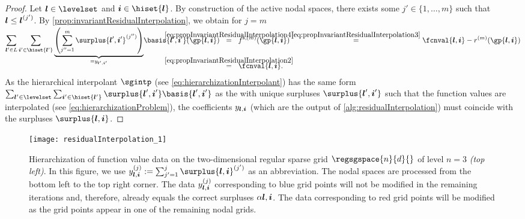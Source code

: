 \begin{proof}
  Let $\*l \in \levelset$ and $\*i \in \hiset{\*l}$.
  By construction of the active nodal spaces,
  there exists some $j' \in \{1, \dotsc, m\}$ such that ${\boldsymbol{l}} \le {\boldsymbol{l}}^{(j')}$.
  By \cref{prop:invariantResidualInterpolation}, we obtain
  for $j = m$
  \begin{subequations}
    \begin{align}
      \sum_{\*l' \in L} \sum_{\*i' \in \hiset{\*l'}}
      \smash{
        \underbrace{
          \left(\sum_{j''=1}^{m} \surplus{\*l',\*i'}^{(j'')}\right)
        }_{= \linout{\*l',\*i'}}
      }
      \basis{\*l',\*i'}(\gp{\*l,\*i})
      &\quad\;
      \mathclap{\overset{\eqref{eq:propInvariantResidualInterpolation4}}{=}}
      \quad\;
      f^{\sparse,(m)}(\gp{\*l,\*i})
      \overset{\eqref{eq:propInvariantResidualInterpolation3}}{=}
      \fcnval{\*l,\*i} - r^{(m)}(\gp{\*l,\*i})\\
      &\quad\;
      \mathclap{\overset{\eqref{eq:propInvariantResidualInterpolation2}}{=}}
      \quad\;
      \fcnval{\*l,\*i}.
    \end{align}
  \end{subequations}
  As the hierarchical interpolant $\sgintp$
  (see \eqref{eq:hierarchizationInterpolant})
  has the same form
  $\sum_{\*l' \in \levelset} \sum_{\*i' \in \hiset{\*l'}}
  \surplus{\*l',\*i'} \basis{\*l',\*i'}$ as the \lhs
  with unique surpluses $\surplus{\*l',\*i'}$ such that the function values
  are interpolated (see \eqref{eq:hierarchizationProblem}),
  the coefficients $y_{{\boldsymbol{l}},{\boldsymbol{i}}}$
  (which are the output of \cref{alg:residualInterpolation})
  must coincide with the surpluses $\surplus{\*l,\*i}$.
\end{proof}

\begin{SCfigure}
  \texttt{[image: residualInterpolation\_1]}%
  \caption[%
    Hierarchization with residual interpolation%
  ]{%
    Hierarchization of function value data on the
    two-dimensional regular sparse grid
    $\regsgspace{n}{d}{}$ of level $n = 3$ \emph{(top left)}.
    In this figure, we use
    $\linout{\*l,\*i}^{(j)} := \sum_{j'=1}^j \surplus{\*l,\*i}^{(j')}$
    as an abbreviation.
    The nodal spaces are processed from the bottom left to
    the top right corner.
    The data $y_{{\boldsymbol{l}},{\boldsymbol{i}}}^{(j)}$
    corresponding to \textcolor{C0}{blue grid points}
    will not be modified in the remaining iterations
    and, therefore, already equals the correct surpluses $\alpha{{\boldsymbol{l}},{\boldsymbol{i}}}$.
    The data corresponding to \textcolor{C1}{red grid points}
    will be modified as the grid points appear in one of the remaining
    nodal grids.%
  }%
  \label{fig:residualInterpolation}%
\end{SCfigure}
